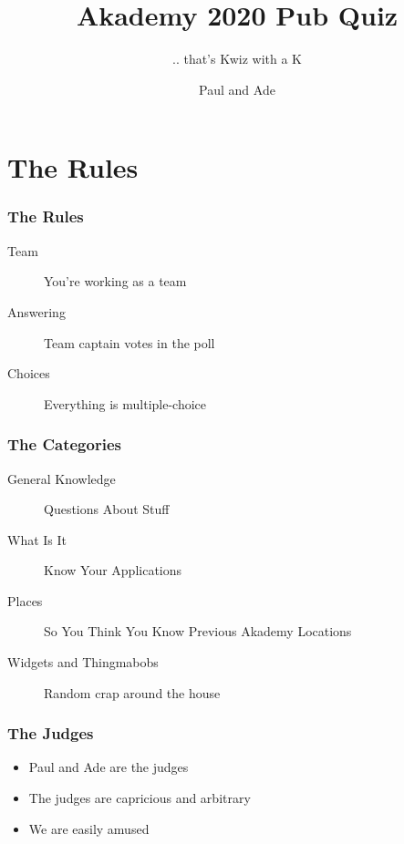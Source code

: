 \documentclass[t,compress,aspectratio=169]{beamer}
\title{Akademy 2020 Pub Quiz}
\subtitle{.. that's Kwiz with a K}
\author{Paul and Ade}
\begin{document}
\begin{withoutheadline}
\begin{frame}
\titlepage
\end{frame}
\end{withoutheadline}

\section{The Rules}

\begin{frame}
    \frametitle{The Rules}
    \begin{description}
        \item[Team] You're working as a team
        \pause
        \item[Answering] Team captain votes in the poll
        \pause
        \item[Choices] Everything is multiple-choice
    \end{description}
\end{frame}

\begin{frame}
    \frametitle{The Categories}
    \begin{description}
        \item[General Knowledge] Questions About Stuff
        \item[What Is It] Know Your Applications
        \item[Places] So You Think You Know Previous Akademy Locations 
        \item[Widgets and Thingmabobs] Random crap around the house
    \end{description}
\end{frame}

\begin{frame}
    \frametitle{The Judges}
    \begin{itemize}
        \item Paul and Ade are the judges
        \item The judges are capricious and arbitrary
        \item We are easily amused
    \end{itemize}
\end{frame}
\end{document}

